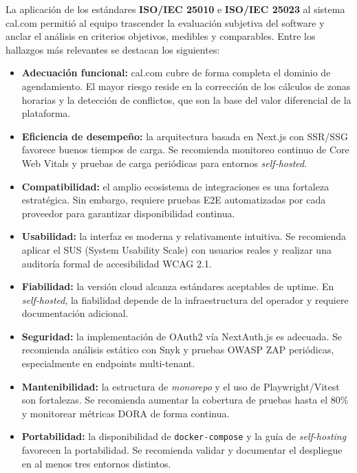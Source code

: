 \documentclass[12pt, a4paper]{article}
\begin{document}
La aplicación de los estándares \textbf{ISO/IEC 25010} e \textbf{ISO/IEC 25023} al
sistema cal.com permitió al equipo trascender la evaluación subjetiva del software y
anclar el análisis en criterios objetivos, medibles y comparables. Entre los hallazgos
más relevantes se destacan los siguientes:

\begin{itemize}
    \item \textbf{Adecuación funcional:} cal.com cubre de forma completa el dominio de agendamiento. El mayor riesgo reside en la corrección de los cálculos de zonas horarias y la detección de conflictos, que son la base del valor diferencial de la plataforma.

    \item \textbf{Eficiencia de desempeño:} la arquitectura basada en Next.js con SSR/SSG favorece buenos tiempos de carga. Se recomienda monitoreo continuo de Core Web Vitals y pruebas de carga periódicas para entornos \textit{self-hosted}.

    \item \textbf{Compatibilidad:} el amplio ecosistema de integraciones es una fortaleza estratégica. Sin embargo, requiere pruebas E2E automatizadas por cada proveedor para garantizar disponibilidad continua.

    \item \textbf{Usabilidad:} la interfaz es moderna y relativamente intuitiva. Se recomienda aplicar el SUS (System Usability Scale) con usuarios reales y realizar una auditoría formal de accesibilidad WCAG 2.1.

    \item \textbf{Fiabilidad:} la versión cloud alcanza estándares aceptables de uptime. En \textit{self-hosted}, la fiabilidad depende de la infraestructura del operador y requiere documentación adicional.

    \item \textbf{Seguridad:} la implementación de OAuth2 vía NextAuth.js es adecuada. Se recomienda análisis estático con Snyk y pruebas OWASP ZAP periódicas, especialmente en endpoints multi-tenant.

    \item \textbf{Mantenibilidad:} la estructura de \textit{monorepo} y el uso de Playwright/Vitest son fortalezas. Se recomienda aumentar la cobertura de pruebas hasta el 80\% y monitorear métricas DORA de forma continua.

    \item \textbf{Portabilidad:} la disponibilidad de \texttt{docker-compose} y la guía de \textit{self-hosting} favorecen la portabilidad. Se recomienda validar y documentar el despliegue en al menos tres entornos distintos.
\end{itemize}
\end{document}
